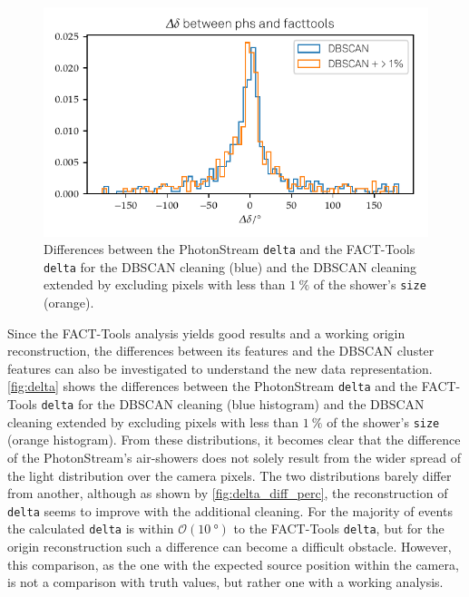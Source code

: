 %
\begin{figure}
  \centering
  \includegraphics[width=\textwidth]{Plots/delta_delta/delta_diff_hist_perc_and_normal_DBSCAN_delta_20131104_162.pdf}
  \caption{Differences between the PhotonStream \texttt{delta} and the FACT-Tools \texttt{delta} for the DBSCAN cleaning (blue) and the DBSCAN cleaning extended by excluding pixels with less than $\SI{1}{\percent}$ of the shower's \texttt{size} (orange).}
  \label{fig:delta}
\end{figure}
%
Since the FACT-Tools analysis yields good results and a working origin
reconstruction, the differences between its features and the DBSCAN cluster
features can also be investigated to understand the new data representation.
\autoref{fig:delta} shows the differences between the PhotonStream
\texttt{delta} and the FACT-Tools \texttt{delta} for the DBSCAN cleaning (blue
histogram) and the DBSCAN cleaning extended by excluding pixels with less
than $\SI{1}{\percent}$ of the shower's \texttt{size} (orange histogram).
From these distributions, it becomes clear that the difference of the
PhotonStream's air-showers does not solely result from the wider spread of
the light distribution over the camera pixels. The two distributions barely
differ from another, although as shown by \autoref{fig:delta_diff_perc}, the
reconstruction of \texttt{delta} seems to improve with the additional
cleaning. For the majority of events the calculated \texttt{delta} is within
$\mathcal{O}(\SI{10}{\degree})$ to the FACT-Tools \texttt{delta}, but for the
origin reconstruction such a difference can become a difficult obstacle.
However, this comparison, as the one with the expected source position
within the camera, is not a comparison with truth values, but rather one
with a working analysis.

